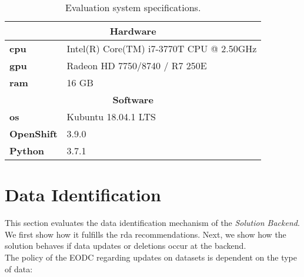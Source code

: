 \documentclass[draft,final]{vutinfth} %
\begin{document}
\begin{table}[]
	\caption{Evaluation system specifications.}
	\centering
	\begin{tabular}{l|l}
		\multicolumn{2}{c}{\textbf{Hardware}} \\ \hline
		\textbf{\acrshort{cpu}} & Intel(R) Core(TM) i7-3770T CPU @ 2.50GHz \\ 
		\textbf{\acrshort{gpu}} & Radeon HD 7750/8740 / R7 250E  \\ 
		\textbf{\acrshort{ram}} & 16 GB  \\ 
		\multicolumn{2}{c}{\textbf{Software}} \\ \hline
		\textbf{\acrshort{os}} & Kubuntu 18.04.1 LTS \\ 
		\textbf{OpenShift} & 3.9.0  \\ 
		\textbf{Python} & 3.7.1  \\ 
	\end{tabular}
	\label{Tab:eva_hardware}
\end{table}
 

\section{Data Identification}\label{Evaluation:special_dataid}
This section evaluates the data identification mechanism of the \textit{Solution Backend}. We first show how it fulfills the \acrshort{rda} recommendations. Next, we  show how the solution behaves if data updates or deletions occur at the backend.\\  
The policy of the EODC regarding updates on datasets is dependent on the type of data:
\end{document}
